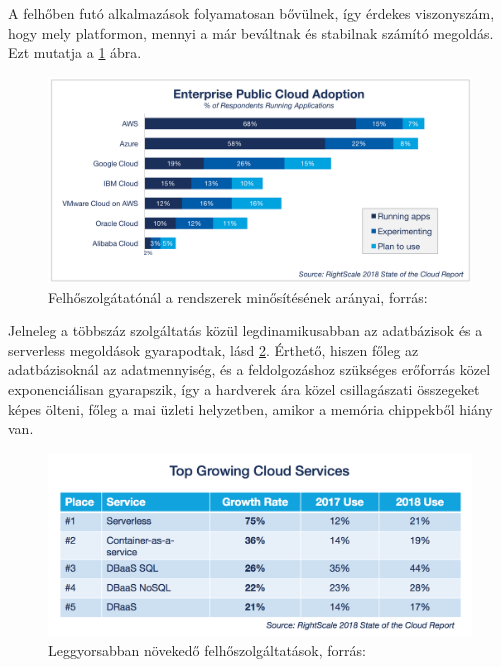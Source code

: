 \documentclass[12pt,oneside,justify,table]{book}
\begin{document}
A felhőben futó alkalmazások folyamatosan bővülnek, így érdekes viszonyszám, hogy mely platformon, mennyi a már beváltnak és stabilnak számító megoldás. Ezt mutatja a \ref{fig:CloudTrends2018} ábra. 
\begin{figure}[H]
\centering
\includegraphics[width=1\textwidth]{23-Cloud-Computing-Trends-Enterprise-Public-Cloud-Adoption.png}
\caption{Felhőszolgátatónál a rendszerek minősítésének arányai, forrás: \cite{RightScale}}
\label{fig:CloudTrends2018}
\end{figure}

Jelneleg a többszáz szolgáltatás közül legdinamikusabban az adatbázisok és a serverless megoldások gyarapodtak, lásd \ref{fig:TopGrowingCloudServices}. Érthető, hiszen főleg az adatbázisoknál az adatmennyiség, és a feldolgozáshoz szükséges erőforrás közel exponenciálisan gyarapszik, így a hardverek ára közel csillagászati összegeket képes ölteni, főleg a mai üzleti helyzetben, amikor a memória chippekből hiány van. \\
\begin{figure}[H]
\centering
\includegraphics[width=1\textwidth]{6-Cloud-Computing-Trends-Serverless-Top-Growing-Cloud-Service.png}
\caption{Leggyorsabban növekedő felhőszolgáltatások, forrás: \cite{RightScale}}
\label{fig:TopGrowingCloudServices}
\end{figure}
\end{document}
